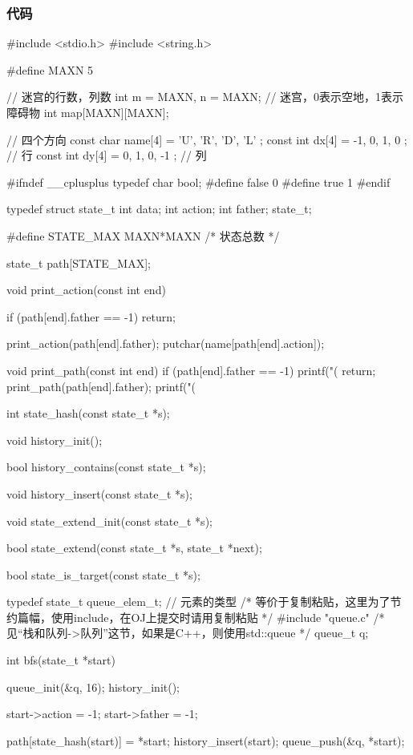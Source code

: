\subsubsection{代码}
\begin{Codex}[label=maze.c]
#include <stdio.h>
#include <string.h>

#define MAXN 5

// 迷宫的行数，列数
int m = MAXN, n = MAXN;
// 迷宫，0表示空地，1表示障碍物
int map[MAXN][MAXN];

// 四个方向
const char name[4] = { 'U', 'R', 'D', 'L' };
const int dx[4] = { -1, 0, 1, 0 }; // 行
const int dy[4] = { 0, 1, 0, -1 }; // 列

#ifndef __cplusplus
typedef char bool;
#define false 0
#define true 1
#endif

typedef struct state_t {
    int data;
    int action;
    int father;
} state_t;

#define STATE_MAX MAXN*MAXN  /* 状态总数 */

state_t path[STATE_MAX];

void print_action(const int end) {
    if (path[end].father == -1) return;

    print_action(path[end].father);
    putchar(name[path[end].action]);
}

void print_path(const int end) {
    if (path[end].father == -1) {
        printf("(%
        return;
    }
    print_path(path[end].father);
    printf("(%
}

int state_hash(const state_t *s);

void history_init();

bool history_contains(const state_t *s);

void history_insert(const state_t *s);

void state_extend_init(const state_t *s);

bool state_extend(const state_t *s, state_t *next);

bool state_is_target(const state_t *s);

typedef state_t queue_elem_t; // 元素的类型
/* 等价于复制粘贴，这里为了节约篇幅，使用include，在OJ上提交时请用复制粘贴 */
#include "queue.c"  /* 见“栈和队列->队列”这节，如果是C++，则使用std::queue */
queue_t q;

int bfs(state_t *start) {
    queue_init(&q, 16);
    history_init();

    start->action = -1;
    start->father = -1;

    path[state_hash(start)] = *start;
    history_insert(start);
    queue_push(&q, *start);

}
\end{Codex}
